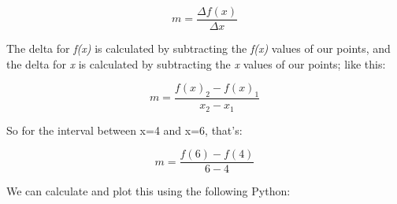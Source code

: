 \documentclass[11pt]{article}
\begin{document}
\begin{equation}m = \frac{\Delta{f(x)}}{\Delta{x}} \end{equation}

The delta for \emph{f(x)} is calculated by subtracting the \emph{f(x)}
values of our points, and the delta for \emph{x} is calculated by
subtracting the \emph{x} values of our points; like this:

\begin{equation}m = \frac{f(x)_{2} - f(x)_{1}}{x_{2} - x_{1}} \end{equation}

So for the interval between x=4 and x=6, that's:

\begin{equation}m = \frac{f(6) - f(4)}{6 - 4} \end{equation}

We can calculate and plot this using the following Python:
\end{document}
